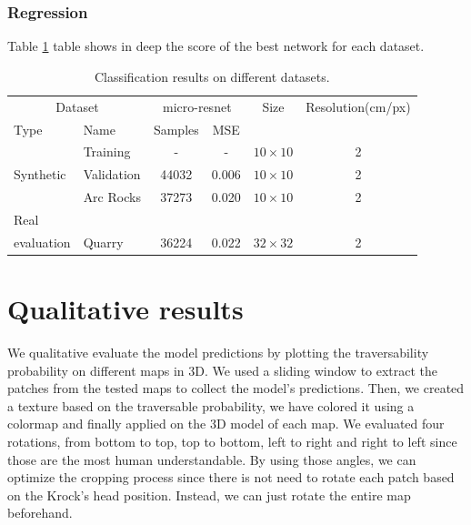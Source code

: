 \documentclass[../document.tex]{subfiles}
\begin{document}
\subsubsection{Regression}
Table \ref{tab : regression-results} table shows in deep the score of the best network for each dataset.
\begin{table}[htbp]
    \centering
    \begin{tabular}{@{}llcccc@{}}
    \toprule
    \multicolumn{2}{c}{Dataset} & \multicolumn{2}{c}{micro-resnet} & Size & Resolution(cm/px) \\
    \cmidrule{1-2} \cmidrule{4-5}
    Type     &  Name  & Samples & MSE      & \\
    \toprule
      \multirow{3}{*}{Synthetic}  & Training  &  - & - &$10\times10$  & 2\\
      &  Validation   & 44032 &  0.006  &  $10\times10$ & 2 \\
      & Arc Rocks & 37273 & 0.020  &  $10\times10$& 2 \\
      \cmidrule{2-6}
    Real\\evaluation & Quarry & 36224 &  0.022 & $32\times32$ & 2\\
    \bottomrule   
\end{tabular}
\caption{Classification results on different datasets.}
\label{tab : regression-results}
\end{table}
\section{Qualitative results}
We qualitative evaluate the model predictions by plotting the traversability probability on different maps in 3D.  We used a sliding window to extract the patches from the tested maps to collect the model's predictions. Then, we created a texture based on the traversable probability, we have colored it using a colormap and finally applied on the 3D model of each map. We evaluated four rotations, from bottom to top, top to bottom, left to right and right to left since those are the most human understandable. By using those angles, we can optimize the cropping process since there is not need to rotate each patch based on the Krock's head position. Instead, we can just rotate the entire map beforehand. 
\end{document}
